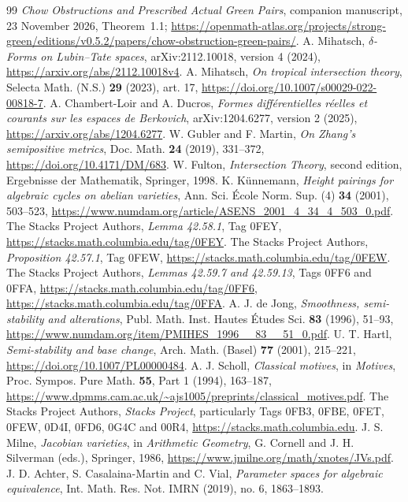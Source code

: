 \documentclass[11pt]{article}
\theoremstyle{definition}
\theoremstyle{remark}
\numberwithin{equation}{section}
\begin{document}
\begin{thebibliography}{99}
 \emph{Chow Obstructions and Prescribed Actual Green Pairs}, companion manuscript, 23 November 2026, Theorem~1.1; \url{https://openmath-atlas.org/projects/strong-green/editions/v0.5.2/papers/chow-obstruction-green-pairs/}.
 A. Mihatsch, \emph{$\delta$-Forms on Lubin--Tate spaces}, arXiv:2112.10018, version 4 (2024), \url{https://arxiv.org/abs/2112.10018v4}.
 A. Mihatsch, \emph{On tropical intersection theory}, Selecta Math. (N.S.) \textbf{29} (2023), art. 17, \url{https://doi.org/10.1007/s00029-022-00818-7}.
 A. Chambert-Loir and A. Ducros, \emph{Formes diff\'erentielles r\'eelles et courants sur les espaces de Berkovich}, arXiv:1204.6277, version 2 (2025), \url{https://arxiv.org/abs/1204.6277}.
 W. Gubler and F. Martin, \emph{On Zhang's semipositive metrics}, Doc. Math. \textbf{24} (2019), 331--372, \url{https://doi.org/10.4171/DM/683}.
 W. Fulton, \emph{Intersection Theory}, second edition, Ergebnisse der Mathematik, Springer, 1998.
 K. K\"unnemann, \emph{Height pairings for algebraic cycles on abelian varieties}, Ann. Sci. \'Ecole Norm. Sup. (4) \textbf{34} (2001), 503--523, \url{https://www.numdam.org/article/ASENS_2001_4_34_4_503_0.pdf}.
 The Stacks Project Authors, \emph{Lemma 42.58.1}, Tag 0FEY, \url{https://stacks.math.columbia.edu/tag/0FEY}.
 The Stacks Project Authors, \emph{Proposition 42.57.1}, Tag 0FEW, \url{https://stacks.math.columbia.edu/tag/0FEW}.
 The Stacks Project Authors, \emph{Lemmas 42.59.7 and 42.59.13}, Tags 0FF6 and 0FFA, \url{https://stacks.math.columbia.edu/tag/0FF6}, \url{https://stacks.math.columbia.edu/tag/0FFA}.
 A. J. de Jong, \emph{Smoothness, semi-stability and alterations}, Publ. Math. Inst. Hautes \'Etudes Sci. \textbf{83} (1996), 51--93, \url{https://www.numdam.org/item/PMIHES_1996__83__51_0.pdf}.
 U. T. Hartl, \emph{Semi-stability and base change}, Arch. Math. (Basel) \textbf{77} (2001), 215--221, \url{https://doi.org/10.1007/PL00000484}.
 A. J. Scholl, \emph{Classical motives}, in \emph{Motives}, Proc. Sympos. Pure Math. \textbf{55}, Part 1 (1994), 163--187, \url{https://www.dpmms.cam.ac.uk/~ajs1005/preprints/classical_motives.pdf}.
 The Stacks Project Authors, \emph{Stacks Project}, particularly Tags 0FB3, 0FBE, 0FET, 0FEW, 0D4I, 0FD6, 0G4C and 00R4, \url{https://stacks.math.columbia.edu}.
 J. S. Milne, \emph{Jacobian varieties}, in \emph{Arithmetic Geometry}, G. Cornell and J. H. Silverman (eds.), Springer, 1986, \url{https://www.jmilne.org/math/xnotes/JVs.pdf}.
 J. D. Achter, S. Casalaina-Martin and C. Vial, \emph{Parameter spaces for algebraic equivalence}, Int. Math. Res. Not. IMRN (2019), no. 6, 1863--1893.
\end{thebibliography}
\end{document}
